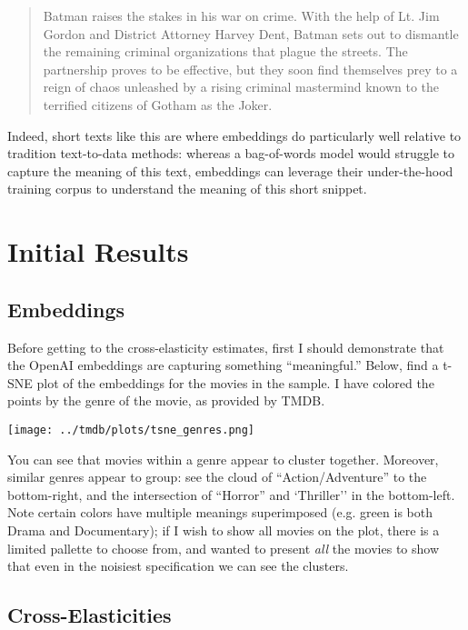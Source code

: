 \documentclass{article}
\begin{document}
\begin{quote}
    Batman raises the stakes in his war on crime. With the help of Lt. Jim Gordon and District Attorney Harvey Dent, Batman sets out to dismantle the remaining criminal organizations that plague the streets. The partnership proves to be effective, but they soon find themselves prey to a reign of chaos unleashed by a rising criminal mastermind known to the terrified citizens of Gotham as the Joker.
\end{quote}

Indeed, short texts like this are where embeddings do particularly well relative to tradition text-to-data methods: whereas a bag-of-words model would struggle to capture the meaning of this text, embeddings can leverage their under-the-hood training corpus to understand the meaning of this short snippet. 

\section{Initial Results}

\subsection{Embeddings}

Before getting to the cross-elasticity estimates, first I should demonstrate that the OpenAI embeddings are capturing something ``meaningful.'' Below, find a t-SNE plot of the embeddings for the movies in the sample. I have colored the points by the genre of the movie, as provided by TMDB.

\begin{center}
    \texttt{[image: ../tmdb/plots/tsne\_genres.png]}
\end{center}

You can see that movies within a genre appear to cluster together. Moreover, similar genres appear to group: see the cloud of ``Action/Adventure'' to the bottom-right, and the intersection of ``Horror'' and `Thriller'' in the bottom-left. Note certain colors have multiple meanings superimposed (e.g. green is both Drama and Documentary); if I wish to show all movies on the plot, there is a limited pallette to choose from, and wanted to present \emph{all} the movies to show that even in the noisiest specification we can see the clusters.

\subsection{Cross-Elasticities}
\end{document}
